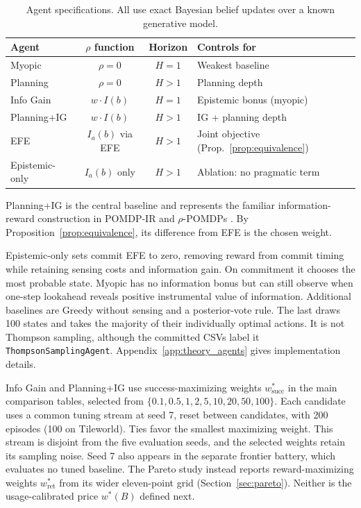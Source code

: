 \documentclass[manuscript, screen, review]{jair}
\newcommand{\tablefontsize}{\fontsize{9}{11}\selectfont\setlength{\tabcolsep}{3pt}}
\newenvironment{tablebody}{\tablefontsize}{}
\begin{document}
\begin{table}[ht]
\centering
\caption{Agent specifications. All use exact Bayesian belief updates over a known generative model.}
\label{tab:agents}
\begin{tablebody}
\begin{tabular}{lccl}
\toprule
Agent & $\rho$ function & Horizon & Controls for \\
\midrule
Myopic & $\rho = 0$ & $H{=}1$ & Weakest baseline \\
Planning & $\rho = 0$ & $H > 1$ & Planning depth \\
Info Gain & $w \cdot I(b)$ & $H{=}1$ & Epistemic bonus (myopic) \\
Planning+IG & $w \cdot I(b)$ & $H > 1$ & IG + planning depth \\
EFE & $I_a(b)$ via EFE & $H > 1$ & Joint objective (Prop.~\ref{prop:equivalence}) \\
Epistemic-only & $I_a(b)$ only & $H > 1$ & Ablation: no pragmatic term \\
\bottomrule
\end{tabular}
\end{tablebody}
\end{table}

Planning+IG is the central baseline and represents the familiar information-reward construction in POMDP-IR and $\rho$-POMDPs \citep{spaan2015,araya2010,satsangi2018}. By Proposition~\ref{prop:equivalence}, its difference from EFE is the chosen weight.

Epistemic-only sets commit EFE to zero, removing reward from commit timing while retaining sensing costs and information gain. On commitment it chooses the most probable state. Myopic has no information bonus but can still observe when one-step lookahead reveals positive instrumental value of information. Additional baselines are Greedy without sensing and a posterior-vote rule. The last draws 100 states and takes the majority of their individually optimal actions. It is not Thompson sampling, although the committed CSVs label it \texttt{ThompsonSamplingAgent}. Appendix~\ref{app:theory_agents} gives implementation details.

Info Gain and Planning+IG use success-maximizing weights $w^*_{\mathrm{succ}}$ in the main comparison tables, selected from $\{0.1,0.5,1,2,5,10,20,50,100\}$. Each candidate uses a common tuning stream at seed 7, reset between candidates, with 200 episodes (100 on Tileworld). Ties favor the smallest maximizing weight. This stream is disjoint from the five evaluation seeds, and the selected weights retain its sampling noise. Seed 7 also appears in the separate frontier battery, which evaluates no tuned baseline. The Pareto study instead reports reward-maximizing weights $w^*_{\mathrm{ret}}$ from its wider eleven-point grid (Section~\ref{sec:pareto}). Neither is the usage-calibrated price $w^*(B)$ defined next.
\end{document}

